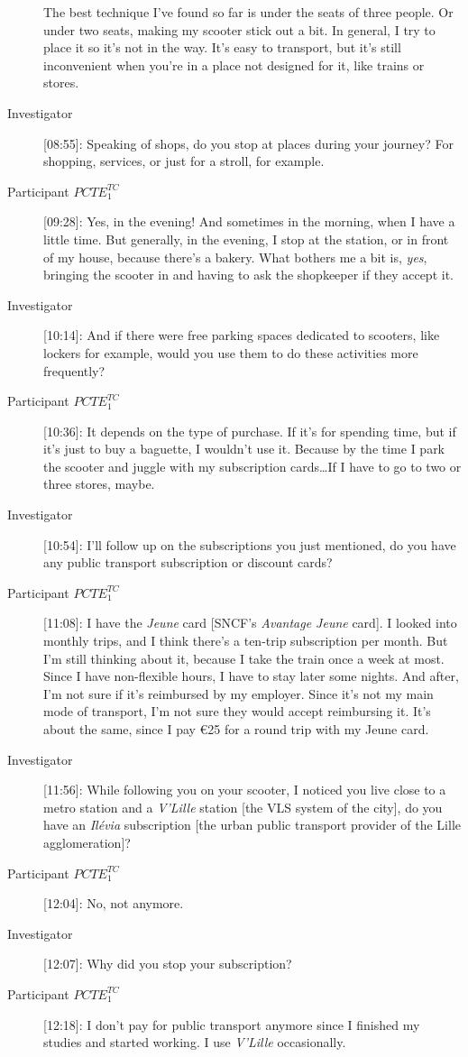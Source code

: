 \begin{description}
    The best technique I’ve found so far is under the seats of three people. Or under two seats, making my scooter stick out a bit. In general, I try to place it so it’s not in the way. It’s easy to transport, but it’s still inconvenient when you're in a place not designed for it, like trains or stores.
    \item[Investigator] [08:55]: Speaking of shops, do you stop at places during your journey? For shopping, services, or just for a stroll, for example.
    \item[Participant \(PCTE^{TC}_{1}\)] [09:28]: Yes, in the evening! And sometimes in the morning, when I have a little time. But generally, in the evening, I stop at the station, or in front of my house, because there’s a bakery. What bothers me a bit is, \textsl{yes}, bringing the scooter in and having to ask the shopkeeper if they accept it.
    \item[Investigator] [10:14]: And if there were free parking spaces dedicated to scooters, like lockers for example, would you use them to do these activities more frequently?
    \item[Participant \(PCTE^{TC}_{1}\)] [10:36]: It depends on the type of purchase. If it’s for spending time, but if it’s just to buy a baguette, I wouldn’t use it. Because by the time I park the scooter and juggle with my subscription cards\dots If I have to go to two or three stores, maybe.
    \item[Investigator] [10:54]: I’ll follow up on the subscriptions you just mentioned, do you have any public transport subscription or discount cards?
    \item[Participant \(PCTE^{TC}_{1}\)] [11:08]: I have the \textsl{Jeune} card [SNCF’s \textsl{Avantage Jeune} card]. I looked into monthly trips, and I think there’s a ten-trip subscription per month. But I’m still thinking about it, because I take the train once a week at most. Since I have non-flexible hours, I have to stay later some nights. And after, I’m not sure if it’s reimbursed by my employer. Since it’s not my main mode of transport, I’m not sure they would accept reimbursing it. It’s about the same, since I pay €25 for a round trip with my Jeune card.
    \item[Investigator] [11:56]: While following you on your scooter, I noticed you live close to a metro station and a \textsl{V'Lille} station [the VLS system of the city], do you have an \textsl{Ilévia} subscription [the urban public transport provider of the Lille agglomeration]?
    \item[Participant \(PCTE^{TC}_{1}\)] [12:04]: No, not anymore.
    \item[Investigator] [12:07]: Why did you stop your subscription?
    \item[Participant \(PCTE^{TC}_{1}\)] [12:18]: I don’t pay for public transport anymore since I finished my studies and started working. I use \textsl{V'Lille} occasionally.%
    

\end{description}
